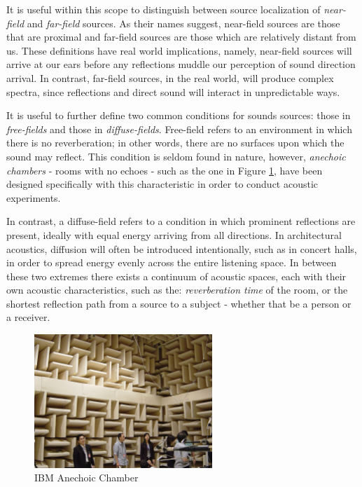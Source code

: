 It is useful within this scope to distinguish between source localization of \textit{near-field} and \textit{far-field} sources. As their names suggest, near-field sources are those that are proximal and far-field sources are those which are relatively distant from us. These definitions have real world implications, namely, near-field sources will arrive at our ears before any reflections muddle our perception of sound direction arrival. In contrast, far-field sources, in the real world, will produce complex spectra, since reflections and direct sound will interact in unpredictable ways. 

It is useful to further define two common conditions for sounds sources: those in \textit{free-fields} and those in \textit{diffuse-fields}. Free-field refers to an environment in which there is no reverberation; in other words, there are no surfaces upon which the sound may reflect. This condition is seldom found in nature, however, \textit{anechoic chambers} - rooms with no echoes - such as the one in Figure \ref{fig:ibm-anechoic}, have been designed specifically with this characteristic in order to conduct acoustic experiments. 

In contrast, a diffuse-field refers to a condition in which prominent reflections are present, ideally with equal energy arriving from all directions. In architectural acoustics, diffusion will often be introduced intentionally, such as in concert halls, in order to spread energy evenly across the entire listening space. In between these two extremes there exists a continuum of acoustic spaces, each with their own acoustic characteristics, such as the: \textit{reverberation time} of the room, or the shortest reflection path from a source to a subject - whether that be a person or a receiver. 

\begin{figure}[ht!]%
\centering
\includegraphics[width=0.6\textwidth]{img/ibm-anechoic.jpg} 
\caption{IBM Anechoic Chamber \cite{FileIBMA4:online}}
\label{fig:ibm-anechoic}
\end{figure}

